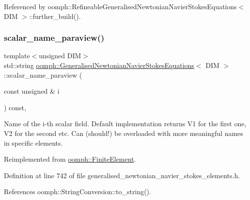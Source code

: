 Referenced by oomph\+::\+Refineable\+Generalised\+Newtonian\+Navier\+Stokes\+Equations$<$ D\+I\+M $>$\+::further\+\_\+build().

\mbox{\label{classoomph_1_1GeneralisedNewtonianNavierStokesEquations_a1fa3cbfd39cbe6fb6bfbd5a02e051aad}} 
\subsubsection{\texorpdfstring{scalar\+\_\+name\+\_\+paraview()}{scalar\_name\_paraview()}}
{\footnotesize\ttfamily template$<$unsigned D\+IM$>$ \\
std\+::string \hyperlink{classoomph_1_1GeneralisedNewtonianNavierStokesEquations}{oomph\+::\+Generalised\+Newtonian\+Navier\+Stokes\+Equations}$<$ D\+IM $>$\+::scalar\+\_\+name\+\_\+paraview (\begin{DoxyParamCaption}\item[{const unsigned \&}]{i }\end{DoxyParamCaption}) const\hspace{0.3cm}{\ttfamily [inline]}, {\ttfamily [virtual]}}



Name of the i-\/th scalar field. Default implementation returns V1 for the first one, V2 for the second etc. Can (should!) be overloaded with more meaningful names in specific elements. 



Reimplemented from \hyperlink{classoomph_1_1FiniteElement_a49cc2d4f7ed5772bbc96f06760372b51}{oomph\+::\+Finite\+Element}.



Definition at line 742 of file generalised\+\_\+newtonian\+\_\+navier\+\_\+stokes\+\_\+elements.\+h.



References oomph\+::\+String\+Conversion\+::to\+\_\+string().

\mbox{\label{classoomph_1_1GeneralisedNewtonianNavierStokesEquations_a9f5f96dc41437cb571865588c98ef80e}} 
